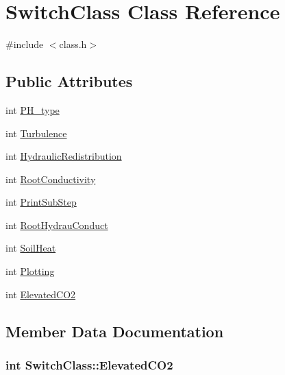 \hypertarget{class_switch_class}{}\section{Switch\+Class Class Reference}
\label{class_switch_class}


{\ttfamily \#include $<$class.\+h$>$}

\subsection*{Public Attributes}
\begin{DoxyCompactItemize}
\item 
int \hyperlink{class_switch_class_ab1c315265c09ce6d7f75cfd4802730b9}{P\+H\+\_\+type}
\item 
int \hyperlink{class_switch_class_af9463634e86dee53233d05ca5c792c92}{Turbulence}
\item 
int \hyperlink{class_switch_class_a912b9b77c508d30df253b10880dc25bd}{Hydraulic\+Redistribution}
\item 
int \hyperlink{class_switch_class_aab79316775d0bb92b9e1b218d5c39175}{Root\+Conductivity}
\item 
int \hyperlink{class_switch_class_adfcb98f73efa2a87f4952e01c5088458}{Print\+Sub\+Step}
\item 
int \hyperlink{class_switch_class_af4f7f6f1797b446456b5f6e6f90c6eec}{Root\+Hydrau\+Conduct}
\item 
int \hyperlink{class_switch_class_a68e0110a6aeaf98f55c8589023cc0677}{Soil\+Heat}
\item 
int \hyperlink{class_switch_class_a836b34168d1ec8a92062a38862418409}{Plotting}
\item 
int \hyperlink{class_switch_class_a4208d2f4783dd4efc3756e55aae1c674}{Elevated\+C\+O2}
\end{DoxyCompactItemize}


\subsection{Member Data Documentation}
\subsubsection[{\texorpdfstring{Elevated\+C\+O2}{ElevatedCO2}}]{\setlength{\rightskip}{0pt plus 5cm}int Switch\+Class\+::\+Elevated\+C\+O2}\hypertarget{class_switch_class_a4208d2f4783dd4efc3756e55aae1c674}{}\label{class_switch_class_a4208d2f4783dd4efc3756e55aae1c674}
